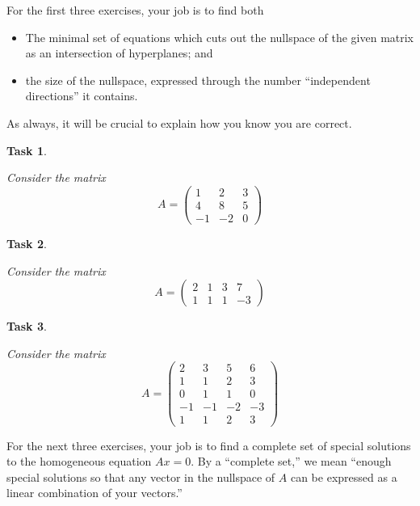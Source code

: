 \documentclass[10pt,]{book}
\theoremstyle{plain}
\numberwithin{equation}{section}
\newtheorem{task}{Task}[chapter]
\begin{document}
      For the first three exercises, your job is to find both
      \begin{itemize}
\item{}The minimal set of equations which cuts out the nullspace of the
          given matrix as an intersection of hyperplanes; and
        \item{}the size of the nullspace, expressed through the number
          ``independent directions'' it contains.
        \end{itemize}

      As always, it will be crucial to explain how you know you are correct.
\begin{task}
\label{task-88}

        Consider the matrix
        \[
          A = \begin{pmatrix}
          1 & 2 & 3 \\
          4 & 8 & 5 \\
          -1 & -2 & 0
          \end{pmatrix}
        \]\end{task}
\begin{task}
\label{task-89}

      Consider the matrix
      \[
        A = \begin{pmatrix}
        2 & 1 & 3 & 7 \\
        1 & 1 & 1 & -3
        \end{pmatrix}
      \]\end{task}
\begin{task}
\label{task-90}

        Consider the matrix
        \[
          A = \begin{pmatrix}
          2 & 3 & 5 & 6 \\
          1 & 1 & 2 & 3 \\
          0 & 1 & 1 & 0 \\
          -1 & -1 & -2 & -3 \\
          1 & 1 & 2 & 3
          \end{pmatrix}
        \]\end{task}
\par

      For the next three exercises, your job is to find a complete set of
      special solutions to the homogeneous equation \(Ax=0\).
      By a ``complete set,'' we mean ``enough special solutions so that
      any vector in the nullspace of \(A\) can be expressed as a linear
      combination of your vectors.''
\par
\end{document}
